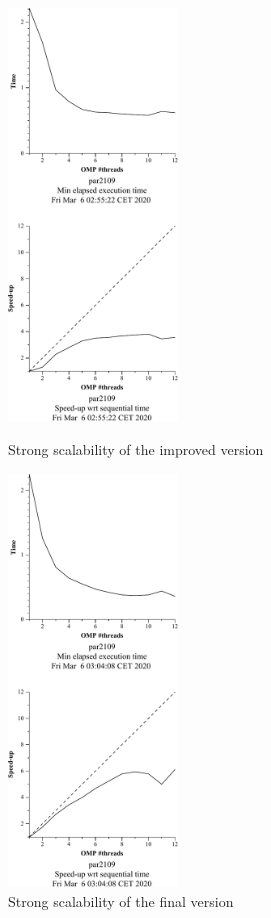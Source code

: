 \begin{figure}[H]
\centering
\begin{minipage}{.5\textwidth}
  \centering
  \includegraphics[width=0.4\textwidth]{./data/3dfft_/3dfft_omp-strong-2.pdf}
  \caption{Strong scalability of the improved version}%
  \label{fig:omp2-plot}
\end{minipage}%
\begin{minipage}{.5\textwidth}
  \centering
  \includegraphics[width=0.4\textwidth]{./data/3dfft_/3dfft_omp-strong-3.pdf}
  \caption{Strong scalability of the final version}%
  \label{fig:omp3-plot}
\end{minipage}
\end{figure}

